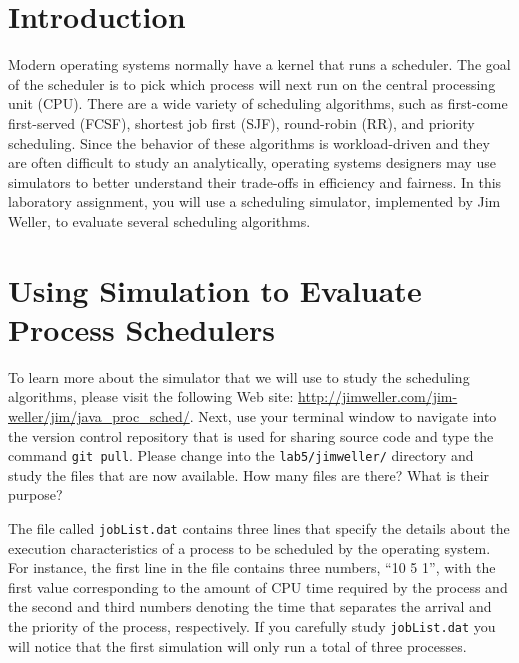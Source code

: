 


\usepackage[compact]{titlesec}



\section*{Introduction}

  Modern operating systems normally have a kernel that runs a scheduler.  The goal of the scheduler is to pick which
  process will next run on the central processing unit (CPU).  There are a wide variety of scheduling algorithms, such
  as first-come first-served (FCSF), shortest job first (SJF), round-robin (RR), and priority scheduling.  Since the
  behavior of these algorithms is \mbox{workload-driven} and they are often difficult to study an analytically,
  operating systems designers may use simulators to better understand their trade-offs in efficiency and fairness. In
  this laboratory assignment, you will use a scheduling simulator, implemented by Jim Weller, to evaluate several
  scheduling algorithms.


\section*{Using Simulation to Evaluate Process Schedulers}

  To learn more about the simulator that we will use to study the scheduling algorithms, please visit the following Web
  site: \url{http://jimweller.com/jim-weller/jim/java_proc_sched/}. Next, use your terminal window to navigate into the
  version control repository that is used for sharing source code and type the command {\tt git pull}.  Please change
  into the {\tt lab5/jimweller/} directory and study the files that are now available. How many files are there? What is
  their purpose?

  The file called {\tt jobList.dat} contains three lines that specify the details about the execution characteristics of
  a process to be scheduled by the operating system.  For instance, the first line in the file contains three numbers,
  ``10 5 1'', with the first value corresponding to the amount of CPU time required by the process and the second and
  third numbers denoting the time that separates the arrival and the priority of the process, respectively. If you
  carefully study {\tt jobList.dat} you will notice that the first simulation will only run a total of three processes.

